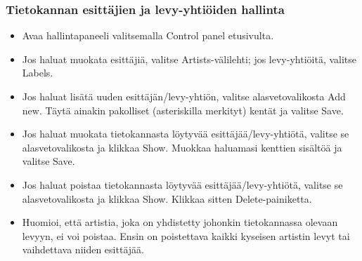 \documentclass[a4paper,12pt]{report}
\begin{document}
\subsubsection{Tietokannan esittäjien ja levy-yhtiöiden hallinta}

\begin{itemize}
  \item Avaa hallintapaneeli valitsemalla Control panel etusivulta.
  \item Jos haluat muokata esittäjiä, valitse Artists-välilehti; jos
    levy-yhtiöitä, valitse Labels.
  \item Jos haluat lisätä uuden esittäjän/levy-yhtiön, valitse
    alasvetovalikosta Add new. Täytä ainakin pakolliset (asteriskilla
    merkityt) kentät ja valitse Save.
  \item Jos haluat muokata tietokannasta löytyvää esittäjää/levy-yhtiötä,
    valitse se alasvetovalikosta ja klikkaa Show. Muokkaa haluamasi kenttien
    sisältöä ja valitse Save.
  \item Jos haluat poistaa tietokannasta löytyvää esittäjää/levy-yhtiötä,
    valitse se alasvetovalikosta ja klikkaa Show. Klikkaa sitten
    Delete-painiketta.
  \item Huomioi, että artistia, joka on yhdistetty johonkin tietokannassa
    olevaan levyyn, ei voi poistaa. Ensin on poistettava kaikki kyseisen
    artistin levyt tai vaihdettava niiden esittäjää.
\end{itemize}
\end{document}

